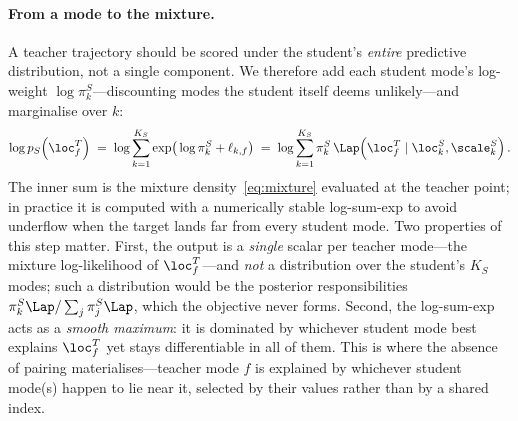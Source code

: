 \paragraph{From a mode to the mixture.} A teacher trajectory should be scored under
the student's \emph{entire} predictive distribution, not a single component. We
therefore add each student mode's log-weight $\log\pi^S_k$---discounting modes the
student itself deems unlikely---and marginalise over $k$:
\begin{equation}
  \label{eq:mix_score}
  \log p_S\!\left(\loc^T_f\right)
    \;=\; \log\sum_{k=1}^{K_S}\exp\!\big(\log\pi^S_k + \ell_{k,f}\big)
    \;=\; \log\sum_{k=1}^{K_S}\pi^S_k\,
          \Lap\!\left(\loc^T_f\mid\loc^S_k,\scale^S_k\right).
\end{equation}
The inner sum is the mixture density~\eqref{eq:mixture} evaluated at the teacher
point; in practice it is computed with a numerically stable log-sum-exp to avoid
underflow when the target lands far from every student mode. Two properties of this
step matter. First, the output is a \emph{single} scalar per teacher mode---the
mixture log-likelihood of $\loc^T_f$---and \emph{not} a distribution over the
student's $K_S$ modes; such a distribution would be the posterior responsibilities
$\pi^S_k\Lap/\sum_j\pi^S_j\Lap$, which the objective never forms. Second, the
log-sum-exp acts as a \emph{smooth maximum}: it is dominated by whichever student
mode best explains $\loc^T_f$ yet stays differentiable in all of them. This is
where the absence of pairing materialises---teacher mode $f$ is explained by
whichever student mode(s) happen to lie near it, selected by their values rather
than by a shared index.

